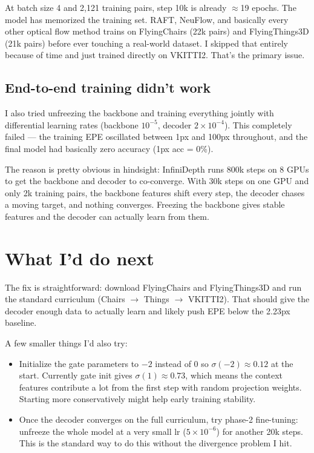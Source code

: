 \documentclass[11pt,a4paper]{article}
\begin{document}
At batch size 4 and 2,121 training pairs, step 10k is already $\approx$19 epochs. The model has memorized the training set. RAFT, NeuFlow, and basically every other optical flow method trains on FlyingChairs (22k pairs) and FlyingThings3D (21k pairs) before ever touching a real-world dataset. I skipped that entirely because of time and just trained directly on VKITTI2. That's the primary issue.

\subsection{End-to-end training didn't work}

I also tried unfreezing the backbone and training everything jointly with differential learning rates (backbone $10^{-5}$, decoder $2\times10^{-4}$). This completely failed --- the training EPE oscillated between 1px and 100px throughout, and the final model had basically zero accuracy (1px acc = 0\%). 

The reason is pretty obvious in hindsight: InfiniDepth runs 800k steps on 8 GPUs to get the backbone and decoder to co-converge. With 30k steps on one GPU and only 2k training pairs, the backbone features shift every step, the decoder chases a moving target, and nothing converges. Freezing the backbone gives stable features and the decoder can actually learn from them.

\section{What I'd do next}

The fix is straightforward: download FlyingChairs and FlyingThings3D and run the standard curriculum (Chairs $\to$ Things $\to$ VKITTI2). That should give the decoder enough data to actually learn and likely push EPE below the 2.23px baseline.

A few smaller things I'd also try:
\begin{itemize}[leftmargin=*,itemsep=2pt]
  \item Initialize the gate parameters to $-2$ instead of $0$ so $\sigma(-2)\approx0.12$ at the start. Currently gate init gives $\sigma(1)\approx0.73$, which means the context features contribute a lot from the first step with random projection weights. Starting more conservatively might help early training stability.
  \item Once the decoder converges on the full curriculum, try phase-2 fine-tuning: unfreeze the whole model at a very small lr ($5\times10^{-6}$) for another 20k steps. This is the standard way to do this without the divergence problem I hit.
\end{itemize}
\end{document}
